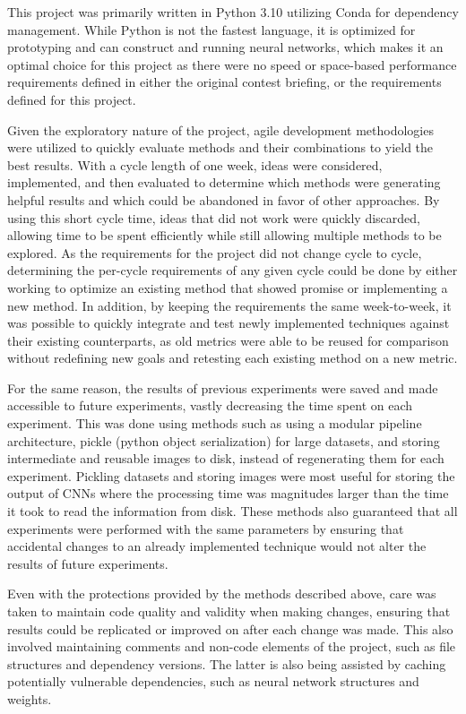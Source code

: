 This project was primarily written in Python 3.10 utilizing Conda for dependency management. While Python is not the fastest language, it is optimized for prototyping and can construct and running neural networks, which makes it an optimal choice for this project as there were no speed or space-based performance requirements defined in either the original contest briefing, or the requirements defined for this project.

Given the exploratory nature of the project, agile development methodologies were utilized to quickly evaluate methods and their combinations to yield the best results. With a cycle length of one week, ideas were considered, implemented, and then evaluated to determine which methods were generating helpful results and which could be abandoned in favor of other approaches. By using this short cycle time, ideas that did not work were quickly discarded, allowing time to be spent efficiently while still allowing multiple methods to be explored. As the requirements for the project did not change cycle to cycle, determining the per-cycle requirements of any given cycle could be done by either working to optimize an existing method that showed promise or implementing a new method. In addition, by keeping the requirements the same week-to-week, it was possible to quickly integrate and test newly implemented techniques against their existing counterparts, as old metrics were able to be reused for comparison without redefining new goals and retesting each existing method on a new metric.

For the same reason, the results of previous experiments were saved and made accessible to future experiments, vastly decreasing the time spent on each experiment. This was done using methods such as using a modular pipeline architecture, pickle \cite{pickle} (python object serialization) for large datasets, and storing intermediate and reusable images to disk, instead of regenerating them for each experiment. Pickling datasets and storing images were most useful for storing the output of CNNs where the processing time was magnitudes larger than the time it took to read the information from disk. These methods also guaranteed that all experiments were performed with the same parameters by ensuring that accidental changes to an already implemented technique would not alter the results of future experiments.

Even with the protections provided by the methods described above, care was taken to maintain code quality and validity when making changes, ensuring that results could be replicated or improved on after each change was made. This also involved maintaining comments and non-code elements of the project, such as file structures and dependency versions. The latter is also being assisted by caching potentially vulnerable dependencies, such as neural network structures and weights.
